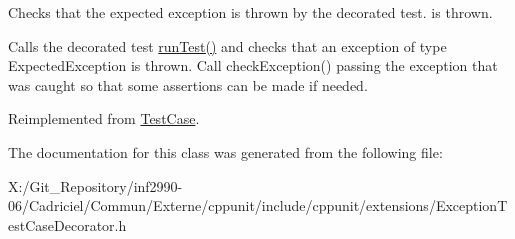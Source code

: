 Checks that the expected exception is thrown by the decorated test. is thrown. 

Calls the decorated test \hyperlink{class_exception_test_case_decorator_a3f78294d459a94f55413162d814f291d}{run\-Test()} and checks that an exception of type Expected\-Exception is thrown. Call check\-Exception() passing the exception that was caught so that some assertions can be made if needed. 

Reimplemented from \hyperlink{class_test_case_a6b55957ac1dfef01e5d9fa2475676f34}{Test\-Case}.



The documentation for this class was generated from the following file\-:\begin{DoxyCompactItemize}
\item 
X\-:/\-Git\-\_\-\-Repository/inf2990-\/06/\-Cadriciel/\-Commun/\-Externe/cppunit/include/cppunit/extensions/Exception\-Test\-Case\-Decorator.\-h\end{DoxyCompactItemize}

